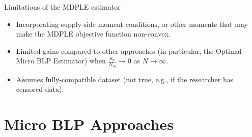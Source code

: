 




\begin{frame}{Limitations of the MDPLE estimator}
    
    \begin{itemize}

        \item Incorporating supply-side moment conditions, or other moments that may make the MDPLE objective function non-convex.
        \item Limited gains compared to other approaches (in particular, the Optimal Micro BLP Estimator) when $\frac{S_m}{N_m}\to 0$ as $N\to\infty$.
        \item Assumes fully-compatible dataset (not true, e.g., if the researcher has censored data).
    \end{itemize}
\end{frame}



\section*{Micro BLP Approaches}

